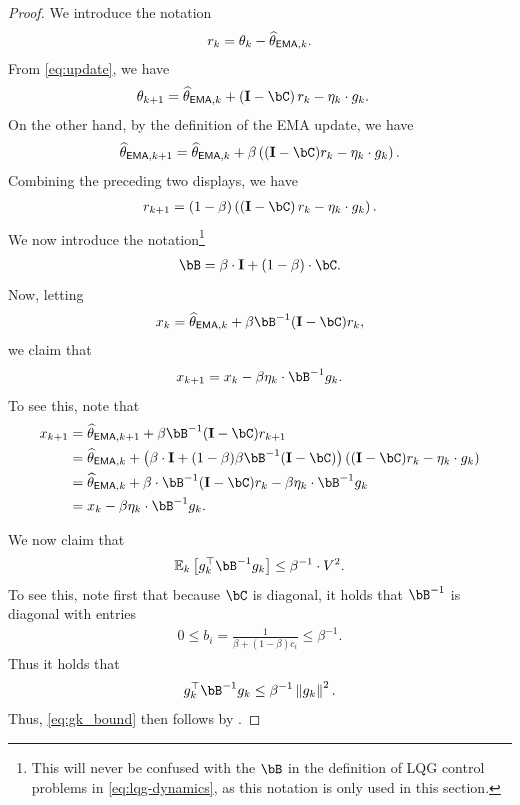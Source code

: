 \begin{proof}
    We introduce the notation
    \begin{align}
        r_k = \theta_k - \thetema[k].
    \end{align}
    From \eqref{eq:update}, we have
    \begin{align}
        \theta_{k+1} &= \thetema[k] + \left( \eye - \bC \right) r_k - \eta_k \cdot g_k.
    \end{align}
    On the other hand, by the definition of the EMA update, we have
    \begin{align}
        \thetema[k+1] = \thetema[k] + \beta \left( (\eye - \bC) r_k - \eta_k \cdot g_k \right).
    \end{align}
    Combining the preceding two displays, we have
    \begin{align}\label{eq:r_update}
        r_{k+1} = (1 - \beta)\left( \left( \eye - \bC \right) r_k - \eta_k \cdot g_k \right).
    \end{align}
    We now introduce the notation\footnote{This will never be confused with the $\bB$ in the definition of LQG control problems in \eqref{eq:lqg-dynamics}, as this notation is only used in this section.}
    \begin{align}\label{eq:B_def}
        \bB = \beta \cdot \eye + (1 - \beta) \cdot \bC.
    \end{align}
    Now, letting
    \begin{align}\label{eq:x_def}
        x_k = \thetema[k] + \beta \bB^{-1} (\eye - \bC) r_k,
    \end{align}
    we claim that
    \begin{align}\label{eq:x_update}
        x_{k+1} = x_k - \beta \eta_k \cdot \bB^{-1} g_k.
    \end{align}
    To see this, note that
    \begin{align}
        x_{k+1} &= \thetema[k+1] + \beta \bB^{-1}(\eye - \bC) r_{k+1} \\
        &= \thetema[k] + \left( \beta \cdot \eye + (1 - \beta) \beta \bB^{-1} (\eye - \bC) \right)\left( (\eye - \bC) r_k - \eta_k \cdot g_k \right) \\
        &= \thetema[k] + \beta \cdot \bB^{-1} (\eye - \bC) r_k - \beta \eta_k \cdot \bB^{-1} g_k \\
        &= x_k - \beta \eta_k \cdot \bB^{-1} g_k.
     \end{align} 

     We now claim that
     \begin{align}\label{eq:gk_bound}
        \ee_k\left[ g_k^\top \bB^{-1} g_k \right] \leq \beta^{-1} \cdot V^2.
     \end{align}
     To see this, note first that because $\bC$ is diagonal, it holds that $\bB^{-1}$ is diagonal with entries
     \begin{align}
        0 \leq b_i = \frac{1}{\beta + (1 - \beta) c_i} \leq \beta^{-1}.
     \end{align}
     Thus it holds that
     \begin{align}
        g_k^\top \bB^{-1} g_k \leq \beta^{-1} \norm{g_k}^2.
     \end{align}
    Thus, \eqref{eq:gk_bound} then follows by .


\end{proof}
